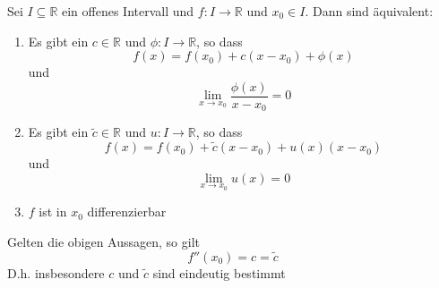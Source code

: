 \begin{Satz}{
	Sei $I \subseteq \mathbb{R}$ ein offenes Intervall und $f: I \rightarrow \mathbb{R}$ und $x_0 \in I$. Dann sind äquivalent:
	\begin{enumerate}
		\item \label{satz1:i}Es gibt ein $c \in \mathbb{R}$ und $\phi: I \rightarrow \mathbb{R}$, so dass
		\begin{equation*}
		f\left(x\right) = f\left(x_0\right) + c\left(x-x_0\right) + \phi\left(x\right)
		\end{equation*} 
		und 
		\begin{equation*} \label{gleichung:i}
			\lim\limits_{x \rightarrow x_0}{\frac{\phi\left(x\right)}{x-x_0}}  = 0
		\end{equation*}
		\item Es gibt ein $ \tilde{c} \in \mathbb{R}$ und $
		u: I \rightarrow \mathbb{R}$, so dass 
	\begin{equation*}		
		f\left(x\right) = f\left(x_0\right) + \tilde{c}\left(x-x_0\right) + u\left(x
		\right)\left(x-x_0\right)
		\end{equation*}
		und 
		\begin{equation*}
		\lim\limits_{x \rightarrow x_0}{u\left(x\right) = 0}
		\end{equation*}
		\item $f$ ist in $x_0$ differenzierbar
	\end{enumerate}
	Gelten die obigen Aussagen, so gilt 
	\begin{equation*}
		f''\left(x_0\right) = c = \tilde{c}
	\end{equation*}
	D.h. insbesondere $c$ und $\tilde{c}$ sind eindeutig bestimmt

}\end{Satz}

